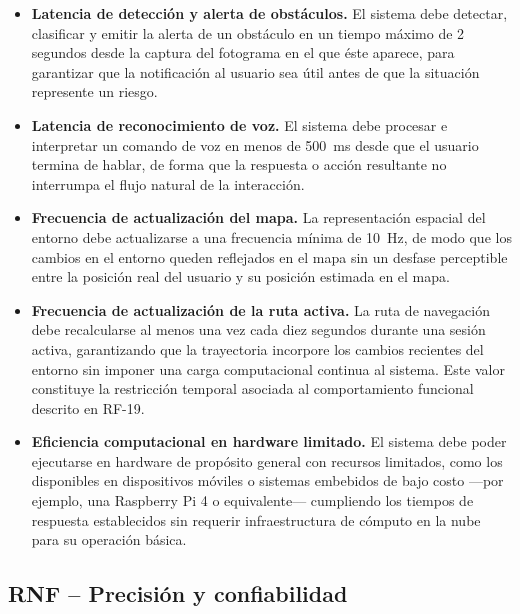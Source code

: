 \begin{itemize}

    \item[\textbf{RNF-01}] \textbf{Latencia de detección y alerta de obstáculos.}
    El sistema debe detectar, clasificar y emitir la alerta de un obstáculo en un tiempo
    máximo de 2 segundos desde la captura del fotograma en el que éste aparece, para
    garantizar que la notificación al usuario sea útil antes de que la situación represente
    un riesgo.

    \item[\textbf{RNF-02}] \textbf{Latencia de reconocimiento de voz.}
    El sistema debe procesar e interpretar un comando de voz en menos de 500~ms desde que
    el usuario termina de hablar, de forma que la respuesta o acción resultante no interrumpa
    el flujo natural de la interacción.

    \item[\textbf{RNF-03}] \textbf{Frecuencia de actualización del mapa.}
    La representación espacial del entorno debe actualizarse a una frecuencia mínima de
    10~Hz, de modo que los cambios en el entorno queden reflejados en el mapa sin un desfase
    perceptible entre la posición real del usuario y su posición estimada en el mapa.

    \item[\textbf{RNF-04}] \textbf{Frecuencia de actualización de la ruta activa.}
    La ruta de navegación debe recalcularse al menos una vez cada diez segundos durante una
    sesión activa, garantizando que la trayectoria incorpore los cambios recientes del
    entorno sin imponer una carga computacional continua al sistema. Este valor constituye
    la restricción temporal asociada al comportamiento funcional descrito en RF-19.

    \item[\textbf{RNF-05}] \textbf{Eficiencia computacional en hardware limitado.}
    El sistema debe poder ejecutarse en hardware de propósito general con recursos limitados,
    como los disponibles en dispositivos móviles o sistemas embebidos de bajo costo ---por
    ejemplo, una Raspberry Pi 4 o equivalente--- cumpliendo los tiempos de respuesta
    establecidos sin requerir infraestructura de cómputo en la nube para su operación básica.

\end{itemize}

\subsection*{RNF -- Precisión y confiabilidad}

